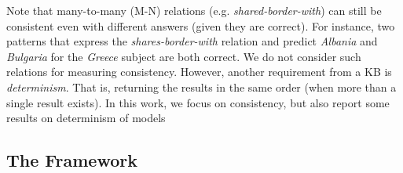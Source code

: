 

Note that many-to-many (M-N) relations (e.g. \textit{shared-border-with}) can still be consistent 
even with different answers (given they are correct). For instance, two patterns that express the \textit{shares-border-with} relation and predict \textit{Albania} and \textit{Bulgaria} for the \textit{Greece} subject are both correct. We do not consider such relations for measuring consistency. However, another requirement from a KB is \textit{determinism}. That is, returning the results in the same order (when more than a single result exists).
In this work, we focus on consistency, but also report some results on determinism of models

\subsection{The Framework}
\label{sec:framework}

